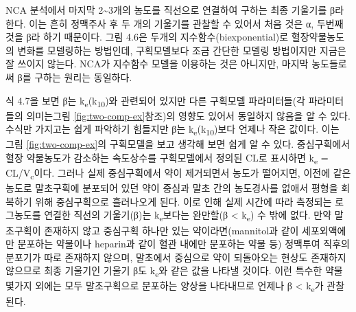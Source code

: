 \documentclass[
  11pt,
  krantz2, a4paper, twoside]{krantz}
\theoremstyle{definition}
\theoremstyle{definition}
\theoremstyle{definition}
\theoremstyle{definition}
\theoremstyle{remark}
\begin{document}
NCA 분석에서 마지막 2\textasciitilde3개의 농도를 직선으로 연결하여 구하는 최종
기울기를 β라 한다. 이는 흔히 정맥주사 후 두 개의 기울기를 관찰할 수
있어서 처음 것은 α, 두번째 것을 β라 하기 때문이다. 그림 4.6은 두개의
지수함수(biexponential)로 혈장약물농도의 변화를 모델링하는 방법인데,
구획모델보다 조금 간단한 모델링 방법이지만 지금은 잘 쓰이지 않는다.
NCA가 지수함수 모델을 이용하는 것은 아니지만, 마지막 농도들로써 β를
구하는 원리는 동일하다.

식 4.7을 보면 β는 k\textsubscript{e}(k\textsubscript{10})와 관련되어 있지만 다른 구획모델
파라미터들(각 파라미터들의 의미는그림 \ref{fig:two-comp-ex}참조)의 영향도 있어서 동일하지
않음을 알 수 있다. 수식만 가지고는 쉽게 파악하기 힘들지만 β는
k\textsubscript{e}(k\textsubscript{10})보다 언제나 작은 값이다. 이는 그림 \ref{fig:two-comp-ex}의 구획모델을 보고
생각해 보면 쉽게 알 수 있다. 중심구획에서 혈장 약물농도가 감소하는
속도상수를 구획모델에서 정의된 CL로 표시하면 k\textsubscript{e} = CL/V\textsubscript{c}이다. 그러나
실제 중심구획에서 약이 제거되면서 농도가 떨어지면, 이전에 같은 농도로
말초구획에 분포되어 있던 약이 중심과 말초 간의 농도경사를 없애서 평형을
회복하기 위해 중심구획으로 흘러나오게 된다. 이로 인해 실제 시간에 따라
측정되는 로그농도를 연결한 직선의 기울기(β)는 k\textsubscript{e}보다는 완만할(β \textless{}
k\textsubscript{e}) 수 밖에 없다. 만약 말초구획이 존재하지 않고 중심구획 하나만 있는
약이라면(mannitol과 같이 세포외액에만 분포하는 약물이나 heparin과 같이
혈관 내에만 분포하는 약물 등) 정맥투여 직후의 분포기가 따로 존재하지
않으며, 말초에서 중심으로 약이 되돌아오는 현상도 존재하지 않으므로 최종
기울기인 기울기 β도 k\textsubscript{e}와 같은 값을 나타낼 것이다. 이런 특수한 약물
몇가지 외에는 모두 말초구획으로 분포하는 양상을 나타내므로 언제나 β \textless{}
k\textsubscript{e}가 관찰된다.
\end{document}
